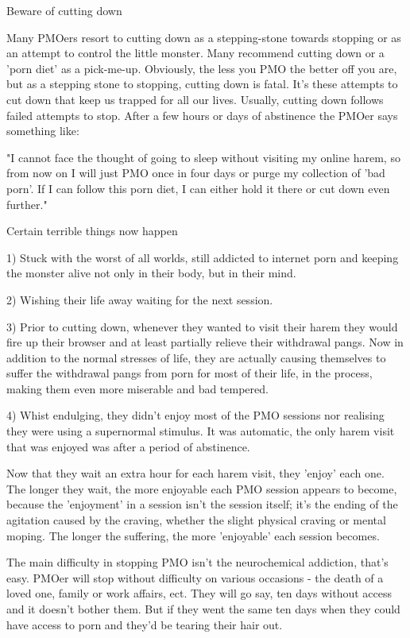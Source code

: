 Beware of cutting down

Many PMOers resort to cutting down as a stepping-stone towards stopping or as an attempt to control the little monster. Many recommend cutting down or a 'porn diet' as a pick-me-up. Obviously, the less you PMO the better off you are, but as a stepping stone to stopping, cutting down is fatal. It's these attempts to cut down that keep us trapped for all our lives. Usually, cutting down follows failed attempts to stop. After a few hours or days of abstinence the PMOer says something like:

  "I cannot face the thought of going to sleep without visiting my online harem, so from now on I will just PMO once in four days or purge my collection of 'bad porn'. If I can follow this porn diet, I can either hold it there or cut down even further."

  Certain terrible things now happen
  
  1) Stuck with the worst of all worlds, still addicted to internet porn and keeping the monster alive not only in their body, but in their mind.

  2) Wishing their life away waiting for the next session.

  3) Prior to cutting down, whenever they wanted to visit their harem they would fire up their browser and at least partially relieve their withdrawal pangs. Now in addition to the normal stresses of life, they are actually causing themselves to suffer the withdrawal pangs from porn for most of their life, in the process, making them even more miserable and bad tempered.

  4) Whist endulging, they didn't enjoy most of the PMO sessions nor realising they were using a supernormal stimulus. It was automatic, the only harem visit that was enjoyed was after a period of abstinence.

Now that they wait an extra hour for each harem visit, they 'enjoy' each one. The longer they wait, the more enjoyable each PMO session appears to become, because the 'enjoyment' in a session isn't the session itself; it's the ending of the agitation caused by the craving, whether the slight physical craving or mental moping. The longer the suffering, the more 'enjoyable' each session becomes.

The main difficulty in stopping PMO isn't the neurochemical addiction, that's easy. PMOer will stop without difficulty on various occasions - the death of a loved one, family or work affairs, ect. They will go say, ten days without access and it doesn't bother them. But if they went the same ten days when they could have access to porn and they'd be tearing their hair out.

